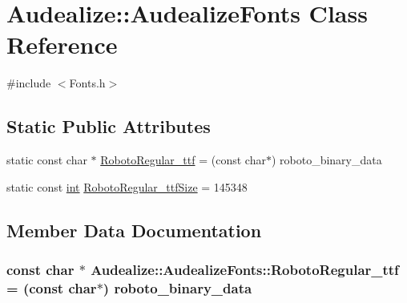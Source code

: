 \hypertarget{class_audealize_1_1_audealize_fonts}{}\section{Audealize\+:\+:Audealize\+Fonts Class Reference}
\label{class_audealize_1_1_audealize_fonts}


{\ttfamily \#include $<$Fonts.\+h$>$}

\subsection*{Static Public Attributes}
\begin{DoxyCompactItemize}
\item 
static const char $\ast$ \hyperlink{class_audealize_1_1_audealize_fonts_a1fea272dd7aae1975ddd34c53c2c7733}{Roboto\+Regular\+\_\+ttf} = (const char$\ast$) roboto\+\_\+binary\+\_\+data
\item 
static const \hyperlink{tk_8h_a83f82f76e7fed06f4c49d2db94028a6d}{int} \hyperlink{class_audealize_1_1_audealize_fonts_a39ba7d9c918c682a7551e41d3dc15ae7}{Roboto\+Regular\+\_\+ttf\+Size} = 145348
\end{DoxyCompactItemize}


\subsection{Member Data Documentation}
\subsubsection[{\texorpdfstring{Roboto\+Regular\+\_\+ttf}{RobotoRegular_ttf}}]{\setlength{\rightskip}{0pt plus 5cm}const char $\ast$ Audealize\+::\+Audealize\+Fonts\+::\+Roboto\+Regular\+\_\+ttf = (const char$\ast$) roboto\+\_\+binary\+\_\+data\hspace{0.3cm}{\ttfamily [static]}}\hypertarget{class_audealize_1_1_audealize_fonts_a1fea272dd7aae1975ddd34c53c2c7733}{}\label{class_audealize_1_1_audealize_fonts_a1fea272dd7aae1975ddd34c53c2c7733}
